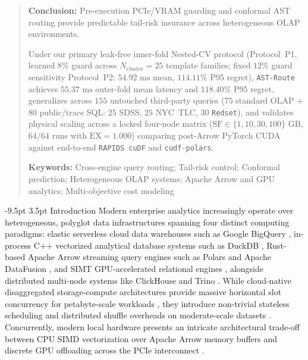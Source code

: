 \documentclass[10pt,a4paper]{article}
\makeatletter
\renewcommand\section{\@startsection{section}{1}{\z@}%
  {-9.5pt \@plus -2pt \@minus -1.5pt}%
  {3.5pt \@plus 1pt}%
  {\normalfont\large\bfseries}}
\makeatother
\begin{document}
\begin{quote}
\textbf{Conclusion:} Pre-execution PCIe/VRAM guarding and conformal AST routing provide predictable tail-risk insurance across heterogeneous OLAP environments.

Under our primary leak-free inner-fold Nested-CV protocol (Protocol~P1, learned $8\%$ guard across $N_{\text{cluster}}=25$ template families; fixed $12\%$ guard sensitivity Protocol~P2: $54.92\text{ ms}$ mean, $114.11\%$ P95 regret), \texttt{AST-Route} achieves $55.37\text{ ms}$ outer-fold mean latency and $118.40\%$ P95 regret, generalizes across $155$ untouched third-party queries ($75$ standard OLAP $+$ $80$ public/trace SQL: $25$ SDSS, $25$ NYC~TLC, $30$ \texttt{Redset}), and validates physical scaling across a locked four-node matrix ($\text{SF}\in\{1,10,30,100\}\text{ GB}$, $64/64$ runs with $\text{EX}=1.000$) comparing post-Arrow PyTorch CUDA against end-to-end \texttt{RAPIDS cuDF} and \texttt{cudf-polars}.

\noindent\textbf{Keywords:} Cross-engine query routing; Tail-risk control; Conformal prediction; Heterogeneous OLAP systems; Apache Arrow and GPU analytics; Multi-objective cost modeling
\end{quote}

\section{Introduction}
Modern enterprise analytics increasingly operate over heterogeneous, polyglot data infrastructures spanning four distinct computing paradigms: elastic serverless cloud data warehouses such as Google BigQuery \cite{melnik2010dremel, melnik2020dremel, lounissi2025funda}, in-process C++ vectorized analytical database systems such as DuckDB \cite{raasveldt2019duckdb, kuiper2024duckdb_ooc}, Rust-based Apache Arrow streaming query engines such as Polars and Apache DataFusion \cite{lamb2024datafusion}, and SIMT GPU-accelerated relational engines \cite{chrysogelos2019hetexchange, shanbhag2020crystal, bress2013hype}, alongside distributed multi-node systems like ClickHouse \cite{schulze2024clickhouse} and Trino \cite{sethi2019presto}. While cloud-native disaggregated storage-compute architectures provide massive horizontal slot concurrency for petabyte-scale workloads \cite{shojaee2024serverless, abdalla2022bigdata}, they introduce non-trivial stateless scheduling and distributed shuffle overheads on moderate-scale datasets \cite{begoli2018calcite, garcia2008database, lounissi2025funda}. Concurrently, modern local hardware presents an intricate architectural trade-off between CPU SIMD vectorization over Apache Arrow memory buffers and discrete GPU offloading across the PCIe interconnect \cite{milicevic2024dlquery, root2019mapd, kim2022blazingsql}.
\end{document}
